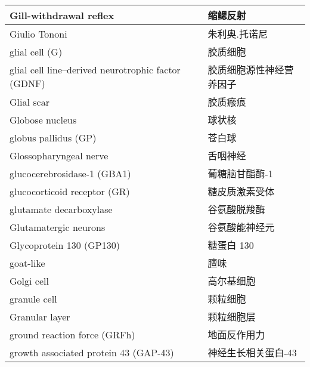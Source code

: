 \begin{longtable}{lll}
	\midrule
	Gill-withdrawal reflex     &&  缩鳃反射  \\
	
	\midrule
	Giulio Tononi     &&  朱利奥.托诺尼  \\
	
	\midrule
	glial cell (G)     &&  胶质细胞  \\
	
	\midrule
	glial cell line–derived neurotrophic factor (GDNF)     &&  胶质细胞源性神经营养因子  \\
	
	\midrule
	Glial scar     &&  胶质瘢痕  \\
	
	\midrule
	Globose nucleus     && 球状核  \\
	
	\midrule
	globus pallidus (GP)    && 苍白球  \\
	
	\midrule
	Glossopharyngeal nerve     && 舌咽神经  \\
	
	\midrule
	glucocerebrosidase-1 (GBA1)     &&  葡糖脑甘酯酶-1  \\
	
	\midrule
	glucocorticoid receptor (GR)    &&  糖皮质激素受体  \\
	
	\midrule
	glutamate decarboxylase     &&  谷氨酸脱羧酶  \\
	
	\midrule
	Glutamatergic neurons     &&  谷氨酸能神经元  \\
	
	\midrule
	Glycoprotein 130 (GP130)    &&  糖蛋白 130  \\
	
	\midrule
	goat-like     &&  	膻味  \\
	
	\midrule
	Golgi cell     &&  	高尔基细胞  \\
	
	\midrule
	granule cell     &&  	颗粒细胞  \\
	
	\midrule
	Granular layer     &&  	颗粒细胞层  \\
	
	\midrule
	ground reaction force (GRFh)     &&  地面反作用力  \\
	
	\midrule
	growth associated protein 43  (GAP-43)   &&  神经生长相关蛋白-43  \\
	

\end{longtable}

